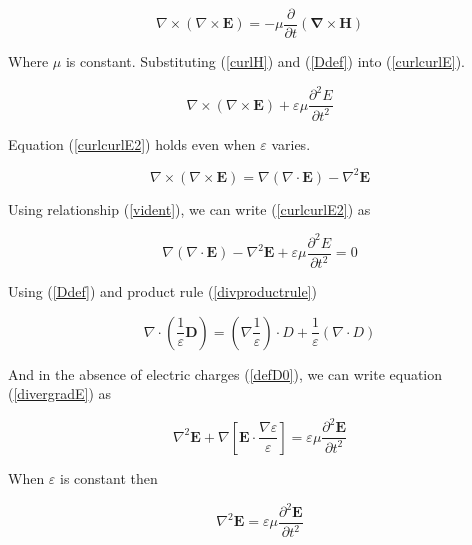 \begin{equation}
\nabla \times (\nabla \times \mathbf{E}) = 
-\mu \frac{\partial{}}{\partial{t}}(\mathbf{\nabla \times H})
\label{curlcurlE}
\end{equation}

Where $\mu$ is constant. Substituting (\ref{curlH}) and (\ref{Ddef})
into (\ref{curlcurlE}).

\begin{equation}
\nabla \times (\nabla \times \mathbf{E}) + \varepsilon \mu
\frac{\partial^2{E}}{\partial{t^2}}
\label{curlcurlE2}
\end{equation}

Equation (\ref{curlcurlE2}) holds even when $\varepsilon$ varies.

\begin{equation}
\nabla \times (\nabla \times \mathbf{E}) =
\nabla (\nabla \cdot \mathbf{E}) - \nabla^2 \mathbf{E}
\label{vident}
\end{equation}

Using relationship (\ref{vident}), we can write (\ref{curlcurlE2}) as

\begin{equation}
\nabla (\nabla \cdot \mathbf{E}) - \nabla^2 \mathbf{E} + \varepsilon \mu
\frac{\partial^2{E}}{\partial{t^2}} = 0
\label{divergradE}
\end{equation}

Using (\ref{Ddef}) and product rule (\ref{divproductrule})

\begin{equation}
\nabla \cdot \left(\frac{1}{\varepsilon}\mathbf{D}\right)=
 \left(\nabla \frac{1}{\varepsilon}\right)
\cdot D + \frac{1}{\varepsilon}(\nabla \cdot D)
\label{divproductrule}
\end{equation}

And in the absence of electric charges (\ref{defD0}), we can write equation
(\ref{divergradE}) as

\begin{equation}
\nabla^2 \mathbf{E} + \nabla \left[ \mathbf{E} \cdot \frac{\nabla \varepsilon}
{\varepsilon}\right]
 = \varepsilon \mu \frac{\partial^2 \mathbf{E}}{\partial t^2}
\label{earlywaveeq}
\end{equation}

When $\varepsilon$ is constant then

\begin{equation}
\nabla^2 \mathbf{E}
 = \varepsilon \mu \frac{\partial^2 \mathbf{E}}{\partial t^2}
\label{waveeq}
\end{equation}

